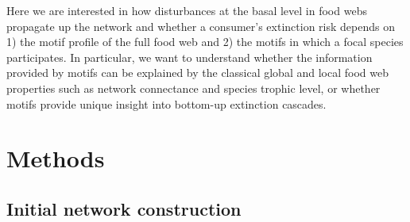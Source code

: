 \documentclass[12pt]{article}
\begin{document}
\begin{spacing}{2.0}
    Here we are interested in how disturbances at the basal level in food webs propagate up the network and whether a consumer's extinction risk depends on 1) the motif profile of the full food web and 2) the motifs in which a focal species participates. In particular, we want to understand whether the information provided by motifs can be explained by the classical global and local food web properties such as network connectance and species trophic level, or whether motifs provide unique insight into bottom-up extinction cascades.
  
    


    	
\section*{Methods}

	\subsection*{Initial network construction}


\end{spacing}
\end{document}
